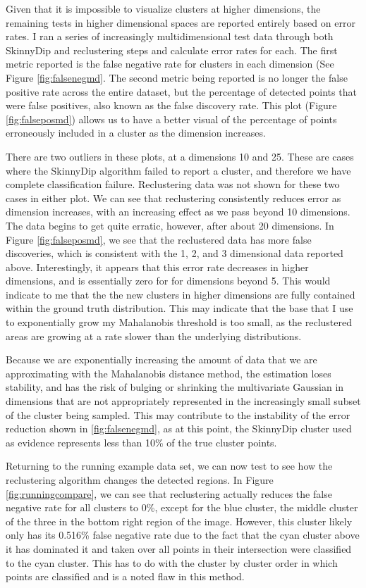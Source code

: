 \documentclass{sig-alternate-05-2015}
\begin{document}
Given that it is impossible to visualize clusters at higher dimensions, the remaining tests in higher dimensional spaces are reported entirely based on error rates. I ran a series of increasingly multidimensional test data through both SkinnyDip and reclustering steps and calculate error rates for each. The first metric reported is the false negative rate for clusters in each dimension (See Figure \ref{fig:falsenegmd}. The second metric being reported is no longer the false positive rate across the entire dataset, but the percentage of detected points that were false positives, also known as the false discovery rate. This plot (Figure \ref{fig:falseposmd}) allows us to have a better visual of the percentage of points erroneously included in a cluster as the dimension increases.

There are two outliers in these plots, at a dimensions 10 and 25. These are cases where the SkinnyDip algorithm failed to report a cluster, and therefore we have complete classification failure. Reclustering data was not shown for these two cases in either plot. We can see that reclustering consistently reduces error as dimension increases, with an increasing effect as we pass beyond 10 dimensions. The data begins to get quite erratic, however, after about 20 dimensions. In Figure \ref{fig:falseposmd}, we see that the reclustered data has more false discoveries, which is consistent with the 1, 2, and 3 dimensional data reported above. Interestingly, it appears that this error rate decreases in higher dimensions, and is essentially zero for for dimensions beyond 5. This would indicate to me that the the new clusters in higher dimensions are fully contained within the ground truth distribution. This may indicate that the base that I use to exponentially grow my Mahalanobis threshold is too small, as the reclustered areas are growing at a rate slower than the underlying distributions.

Because we are exponentially increasing the amount of data that we are approximating with the Mahalanobis distance method, the estimation loses stability, and has the risk of bulging or shrinking the multivariate Gaussian in dimensions that are not appropriately represented in the increasingly small subset of the cluster being sampled. This may contribute to the instability of the error reduction shown in \ref{fig:falsenegmd}, as at this point, the SkinnyDip cluster used as evidence represents less than 10\% of the true cluster points.

Returning to the running example data set, we can now test to see how the reclustering algorithm changes the detected regions. In Figure \ref{fig:runningcompare}, we can see that reclustering actually reduces the false negative rate for all clusters to 0\%, except for the blue cluster, the middle cluster of the three in the bottom right region of the image. However, this cluster likely only has its 0.516\% false negative rate due to the fact that the cyan cluster above it has dominated it and taken over all points in their intersection were classified to the cyan cluster. This has to do with the cluster by cluster order in which points are classified and is a noted flaw in this method. 
\end{document}
